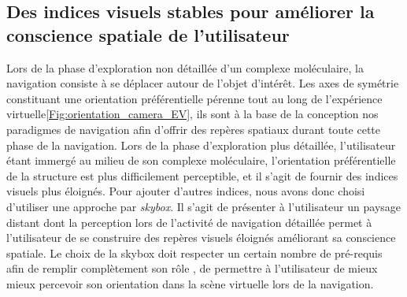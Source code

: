 
 


\subsection{Des indices visuels stables pour améliorer la conscience spatiale de l'utilisateur}




Lors de la phase d'exploration non détaillée d'un complexe moléculaire, la navigation consiste à se déplacer autour de l'objet d'intérêt. Les axes de symétrie constituant une orientation préférentielle pérenne tout au long de l'expérience virtuelle\ref{Fig:orientation_camera_EV}, ils sont à la base de la conception nos paradigmes de navigation afin d'offrir des repères spatiaux durant toute cette phase de la navigation. Lors de la phase d'exploration plus détaillée, l'utilisateur étant immergé au milieu de son complexe moléculaire, l'orientation préférentielle de la structure est plus difficilement perceptible, et il s'agit de fournir des indices visuels plus éloignés. Pour ajouter d'autres indices, nous avons donc choisi d'utiliser une approche par \textit{skybox}. Il s'agit de présenter à l'utilisateur un paysage distant  dont la perception lors de l'activité de navigation détaillée permet à l'utilisateur de se construire des repères visuels éloignés améliorant sa conscience spatiale. Le choix de la skybox doit respecter un certain nombre de pré-requis afin de remplir complètement son rôle \cite{vinson_design_1999}, de permettre à l'utilisateur de mieux mieux percevoir son orientation dans la scène virtuelle lors de la navigation. %

